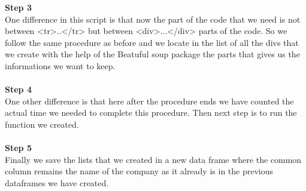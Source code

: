 \documentclass{article}
\begin{document}
\textbf{Step 3}\\
One difference in this script is that now the part of the code that we need is not between <tr>..</tr> but between <div>...</div> parts of the code. So we follow the same procedure as before and we locate in the list of all the divs that we create with the help of the Beatuful soup package the parts that gives us the informations we want to keep.\\\\
\textbf{Step 4}\\
One other difference is that here after the procedure ends we have counted the actual time we needed to complete this procedure. Then next step is to run the function we created.\\\\
\textbf{Step 5}\\
Finally we save the lists that we created in a new data frame where the common column remains the name of the company as it already is in the previous dataframes we have created.
\end{document}
